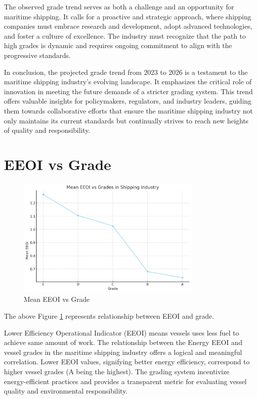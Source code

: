 The observed grade trend serves as both a challenge and an opportunity for maritime shipping. 
It calls for a proactive and strategic approach, where shipping companies must embrace research and development, adopt advanced technologies, and foster a culture of excellence. 
The industry must recognize that the path to high grades is dynamic and requires ongoing commitment to align with the progressive standards.

In conclusion, the projected grade trend from 2023 to 2026 is a testament to the maritime shipping industry's evolving landscape. 
It emphasizes the critical role of innovation in meeting the future demands of a stricter grading system. 
This trend offers valuable insights for policymakers, regulators, and industry leaders, guiding them towards collaborative efforts that ensure the maritime shipping industry not only maintains its current standards but continually strives to reach new heights of quality and responsibility.

\section{EEOI vs Grade}

\begin{figure}[h]
    \centering
    \includegraphics[width=0.8\textwidth]{images/eeoi_grade.png}
    \caption{Mean EEOI vs Grade}
    \label{eeoi_grade}
\end{figure}

The above Figure \ref{eeoi_grade} represents relationship between EEOI and grade.

Lower Efficiency Operational Indicator (EEOI) means vessels uses less fuel to achieve same amount of work.
The relationship between the Energy EEOI and vessel grades in the maritime shipping industry offers a logical and meaningful correlation. 
Lower EEOI values, signifying better energy efficiency, correspond to higher vessel grades (A being the highest). 
The grading system incentivize energy-efficient practices and provides a transparent metric for evaluating vessel quality and environmental responsibility.

